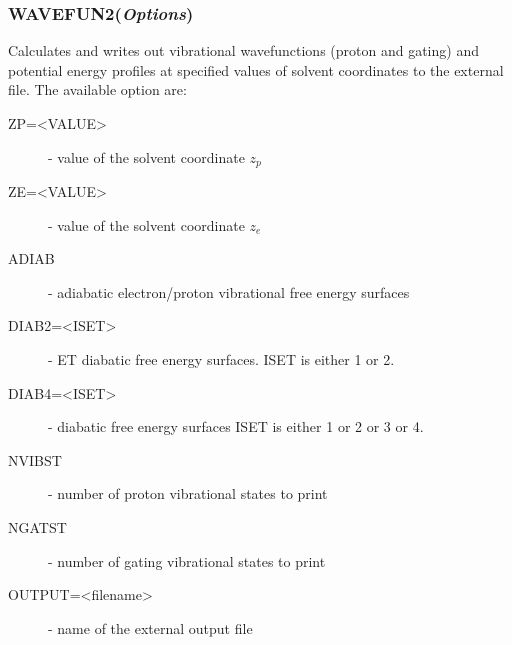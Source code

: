 \documentclass[oneside,11pt,openany]{book}
\newcommand{\tw}{\ttfamily}
\begin{document}
\subsubsection*{WAVEFUN2({\it Options})}
%
Calculates and writes out vibrational wavefunctions
(proton and gating) and potential energy profiles
at specified values of solvent coordinates to the
external file. The available option are:
%
\begin{description}
%
\item[{\tw ZP=<VALUE>}] - value of the solvent coordinate $z_p$
\item[{\tw ZE=<VALUE>}] - value of the solvent coordinate $z_e$

\item[{\tw ADIAB}] - adiabatic electron/proton vibrational free energy surfaces

\item[{\tw DIAB2=<ISET>}] - ET diabatic free energy surfaces.
                            {\tw ISET} is either 1 or 2.

\item[{\tw DIAB4=<ISET>}] - diabatic free energy surfaces
                            {\tw ISET} is either 1 or 2 or 3 or 4.

\item[{\tw NVIBST}] - number of proton vibrational states to print

\item[{\tw NGATST}] - number of gating vibrational states to print

\item[{\tw OUTPUT=<filename>}] - name of the external output file
%
\end{description}
\end{document}

